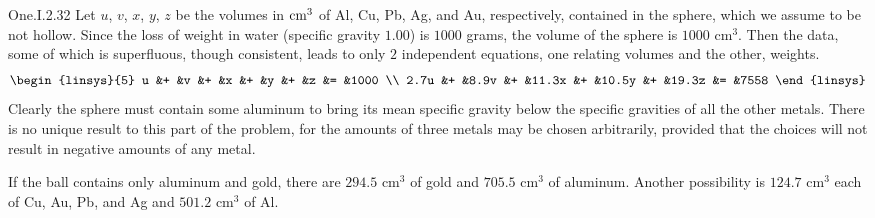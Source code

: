 \begin{ans}{One.I.2.32}
      \answerasgiven
      Let \( u \), \( v \), \( x \), \( y \), \( z \) be the volumes in
      \( {\rm cm}^3 \) of Al, Cu, Pb, Ag, and Au, respectively, contained in
      the sphere, which we assume to be not hollow.
      Since the loss of weight in water (specific gravity \( 1.00 \)) is
      \( 1000 \) grams, the volume of the sphere is \( 1000\mbox{ cm}^3 \).
      Then the data, some of which is superfluous, though consistent, leads to
      only \( 2 \) independent equations, one relating volumes and the
      other, weights.
      \begin{equation*}
        \begin{linsys}{5}
           u  &+  &v    &+  &x     &+  &y     &+  &z     &=  &1000  \\
        2.7u  &+  &8.9v &+  &11.3x &+  &10.5y &+  &19.3z &=  &7558
        \end{linsys}
      \end{equation*}
      Clearly the sphere must contain some aluminum to bring its mean specific
      gravity below the specific gravities of all the other metals.
      There is no unique result to this part of the problem, for the amounts
      of three metals may be chosen arbitrarily, provided that the choices
      will not result in negative amounts of any metal.

      If the ball contains only aluminum and gold, there are
      \( 294.5\mbox{ cm}^3 \) of gold and \( 705.5\mbox{ cm}^3 \) of aluminum.
      Another possibility is \( 124.7\mbox{ cm}^3 \) each of Cu, Au, Pb, and
      Ag and \( 501.2\mbox{ cm}^3  \) of Al.
    
\end{ans}

